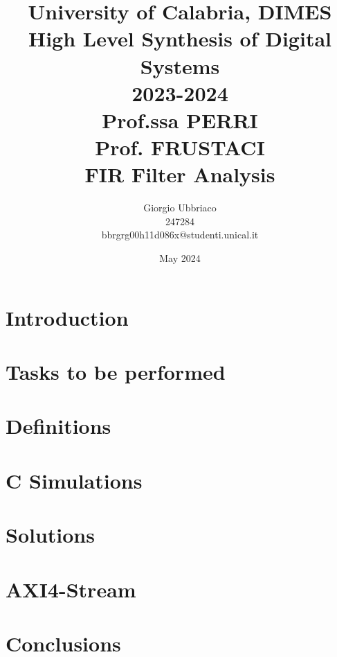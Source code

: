 \documentclass{article}
\title{University of Calabria, DIMES\\High Level Synthesis of Digital Systems\\2023-2024\\Prof.ssa PERRI\\Prof. FRUSTACI\\FIR Filter Analysis}
\author{Giorgio Ubbriaco \\ 247284 \\ bbrgrg00h11d086x@studenti.unical.it}
\date{May 2024}
\begin{document}
    \maketitle
    \renewcommand{\contentsname}{Index}
    \tableofcontents
    \newpage

    \lstlistoflistings
    \listoffigures
    \listoftables
    \newpage
    
    \section{Introduction}
    
    \newpage
    
    \section{Tasks to be performed}
    
    \newpage

    \section{Definitions}
    
    \newpage

    \section{C Simulations}
    
    \newpage
    
    \section{Solutions}
    
    \newpage
    
    \section{AXI4-Stream}
    
    \newpage

    \section{Conclusions}
    
    \newpage
    
\end{document}
